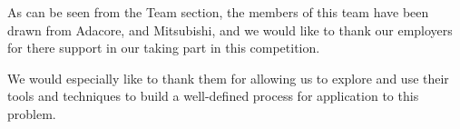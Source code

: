 \label{Acknowledgments}
As can be seen from the Team section, the members of this team have been drawn from Adacore, \altran and Mitsubishi, and we would like to thank our employers for there support in our taking part in this competition. 

We would especially like to thank them for allowing us to explore and use their tools and techniques to build a well-defined process for application to this problem.

